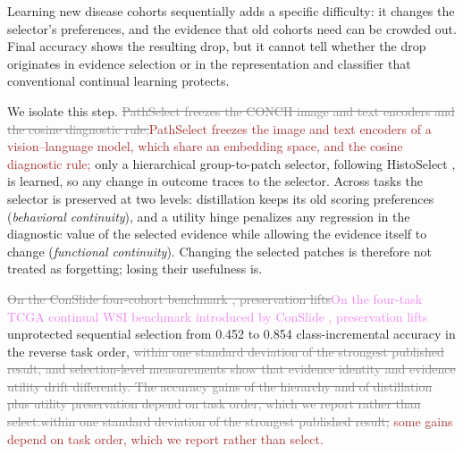\documentclass{article}
\newif\ifmarkup \markuptrue
\newcommand{\repc}[3]{\ifmarkup\textcolor{gray}{\sout{#2}}\textcolor{#1}{#3}\else#3\fi}
\newcommand{\repP}[2]{\repc{violet}{#1}{#2}}  %
\newcommand{\repB}[2]{\repc{brown}{#1}{#2}}   %
\newcommand{\delB}[1]{\ifmarkup\textcolor{gray}{\sout{#1}}\fi}
\begin{document}
Learning new disease cohorts sequentially adds a specific difficulty: it changes the selector's preferences, and the evidence that old cohorts need can be crowded out. Final accuracy shows the resulting drop, but it cannot tell whether the drop originates in evidence selection or in the representation and classifier that conventional continual learning protects.

We isolate this step. \repB{PathSelect freezes the CONCH image and text encoders \cite{lu2024conch} and the cosine diagnostic rule;}{PathSelect freezes the image and text encoders of a vision--language model, which share an embedding space, and the cosine diagnostic rule;} only a hierarchical group-to-patch selector, following HistoSelect \cite{huang2026histoselect}, is learned, so any change in outcome traces to the selector. Across tasks the selector is preserved at two levels: distillation keeps its old scoring preferences (\emph{behavioral continuity}), and a utility hinge penalizes any regression in the diagnostic value of the selected evidence while allowing the evidence itself to change (\emph{functional continuity}). Changing the selected patches is therefore not treated as forgetting; losing their usefulness is.

\repP{On the ConSlide four-cohort benchmark \cite{huang2023conslide}, preservation lifts}{On the four-task TCGA continual WSI benchmark introduced by ConSlide \cite{huang2023conslide}, preservation lifts} unprotected sequential selection from 0.452 to 0.854 class-incremental accuracy in the reverse task order, \repB{within one standard deviation of the strongest published result, and selection-level measurements show that evidence identity and evidence utility drift differently. The accuracy gains of the hierarchy and of distillation plus utility preservation depend on task order, which we report rather than select.}{\delB{within one standard deviation of the strongest published result; }some gains depend on task order, which we report rather than select.}
\end{document}
